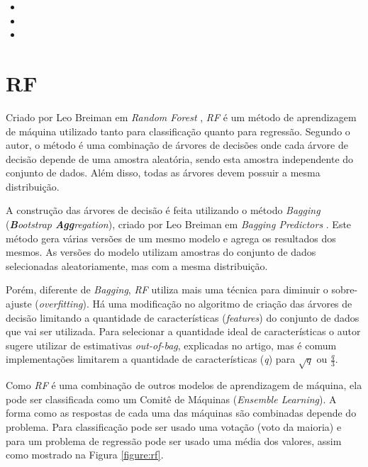 \begin{itemize}
    \item 
    \item
    \item
\end{itemize}

\section{\acrfull{RF}}

Criado por Leo Breiman em \textit{Random Forest} \cite{Breiman:2001:RF:570181.570182}, \textit{\acrshort{RF}} é um método de aprendizagem de máquina utilizado tanto para classificação quanto para regressão. Segundo o autor, o método é uma combinação de árvores de decisões onde cada árvore de decisão depende de uma amostra aleatória, sendo esta amostra independente do conjunto de dados. Além disso, todas as árvores devem possuir a mesma distribuição. 

A construção das árvores de decisão é feita utilizando o método \textit{Bagging} (\textit{\textbf{B}ootstrap \textbf{Agg}regation}), criado por Leo Breiman em \textit{Bagging Predictors} \cite{Breiman:1996:BP:231986.231989}. Este método gera várias versões de um mesmo modelo e agrega os resultados dos mesmos. As versões do modelo utilizam amostras do conjunto de dados selecionadas aleatoriamente, mas com a mesma distribuição.

Porém, diferente de \textit{Bagging}, \textit{\acrshort{RF}} utiliza mais uma técnica para diminuir o sobre-ajuste (\textit{overfitting}). Há uma modificação no algoritmo de criação das árvores de decisão limitando a quantidade de características (\textit{features}) do conjunto de dados que vai ser utilizada. Para selecionar a quantidade ideal de características o autor sugere utilizar de estimativas \textit{out-of-bag}, explicadas no artigo, mas é comum implementações limitarem a quantidade de características (\textit{q}) para $ \sqrt{q} $ ou $ \frac{q}{3} $.

Como \textit{\acrshort{RF}} é uma combinação de outros modelos de aprendizagem de máquina, ela pode ser classificada como um Comitê de Máquinas (\textit{Ensemble Learning}). A forma como as respostas de cada uma das máquinas são combinadas depende do problema. Para classificação pode ser usado uma votação (voto da maioria) e para um problema de regressão pode ser usado uma média dos valores, assim como mostrado na Figura \ref{figure:rf}.

